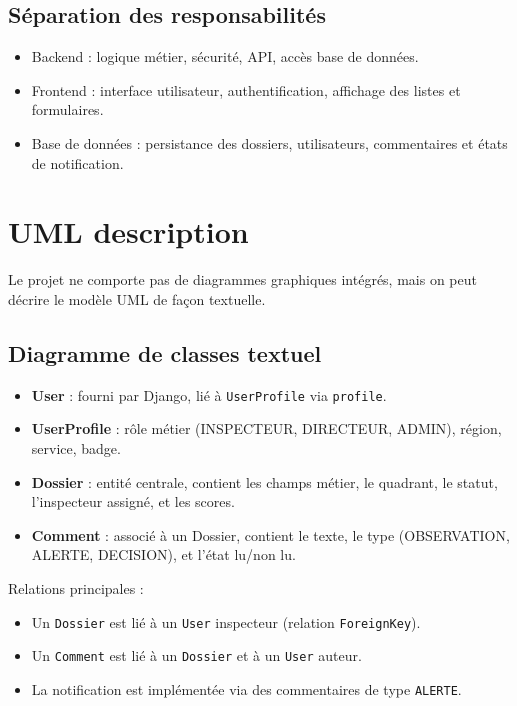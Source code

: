 \documentclass[12pt,a4paper]{article}
\begin{document}
\subsection{Séparation des responsabilités}
\begin{itemize}
    \item Backend : logique métier, sécurité, API, accès base de données.
    \item Frontend : interface utilisateur, authentification, affichage des listes et formulaires.
    \item Base de données : persistance des dossiers, utilisateurs, commentaires et états de notification.
\end{itemize}

\section{UML description}
Le projet ne comporte pas de diagrammes graphiques intégrés, mais on peut décrire le modèle UML de façon textuelle.

\subsection{Diagramme de classes textuel}
\begin{itemize}
    \item \textbf{User} : fourni par Django, lié à \texttt{UserProfile} via \texttt{profile}.
    \item \textbf{UserProfile} : rôle métier (INSPECTEUR, DIRECTEUR, ADMIN), région, service, badge.
    \item \textbf{Dossier} : entité centrale, contient les champs métier, le quadrant, le statut, l’inspecteur assigné, et les scores.
    \item \textbf{Comment} : associé à un Dossier, contient le texte, le type (OBSERVATION, ALERTE, DECISION), et l’état lu/non lu.
\end{itemize}

Relations principales :
\begin{itemize}
    \item Un \texttt{Dossier} est lié à un \texttt{User} inspecteur (relation \texttt{ForeignKey}).
    \item Un \texttt{Comment} est lié à un \texttt{Dossier} et à un \texttt{User} auteur.
    \item La notification est implémentée via des commentaires de type \texttt{ALERTE}.
\end{itemize}
\end{document}
